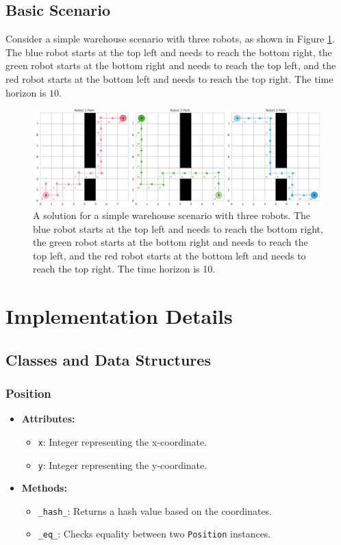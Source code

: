 \documentclass[8pt]{article}
\begin{document}
\subsection{Basic Scenario}
Consider a simple warehouse scenario with three robots, as shown in Figure \ref{fig:warehouse_solution}. The blue robot starts at the top left and needs to reach the bottom right, the green robot starts at the bottom right and needs to reach the top left, and the red robot starts at the bottom left and needs to reach the top right. The time horizon is $10$.
    \begin{figure}[H]
    \includegraphics[width=\textwidth]{figures/warehouse_solution.png}
    \caption{A solution for a simple warehouse scenario with three robots. The blue robot starts at the top left and needs to reach the bottom right, the green robot starts at the bottom right and needs to reach the top left, and the red robot starts at the bottom left and needs to reach the top right. The time horizon is 10.}
    \label{fig:warehouse_solution}
\end{figure}


\section{Implementation Details}

\subsection{Classes and Data Structures}

\subsubsection*{Position}
\begin{itemize}
    \item \textbf{Attributes:} 
    \begin{itemize}
        \item \texttt{x}: Integer representing the x-coordinate.
        \item \texttt{y}: Integer representing the y-coordinate.
    \end{itemize}
    \item \textbf{Methods:}
    \begin{itemize}
        \item \texttt{\_hash\_}: Returns a hash value based on the coordinates.
        \item \texttt{\_eq\_}: Checks equality between two \texttt{Position} instances.
    \end{itemize}
\end{itemize}
\end{document}

